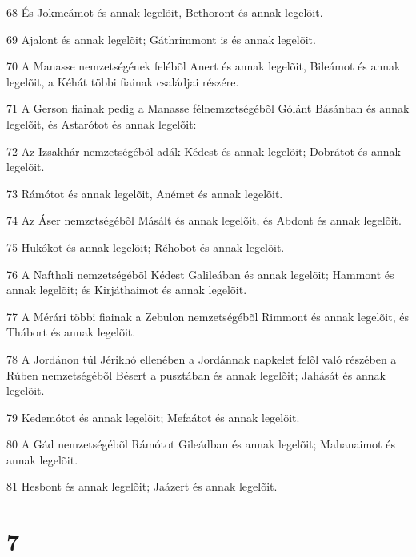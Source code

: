 \par 68 És Jokmeámot és annak legelõit, Bethoront és annak legelõit.
\par 69 Ajalont és annak legelõit; Gáthrimmont is és annak legelõit.
\par 70 A Manasse nemzetségének felébõl Anert és annak legelõit, Bileámot és annak legelõit, a Kéhát többi fiainak családjai részére.
\par 71 A Gerson fiainak pedig a Manasse félnemzetségébõl Gólánt Básánban és annak legelõit, és Astarótot és annak legelõit:
\par 72 Az Izsakhár nemzetségébõl adák Kédest és annak legelõit; Dobrátot és annak legelõit.
\par 73 Rámótot és annak legelõit, Anémet és annak legelõit.
\par 74 Az Áser nemzetségébõl Másált és annak legelõit, és Abdont és annak legelõit.
\par 75 Hukókot és annak legelõit; Réhobot és annak legelõit.
\par 76 A Nafthali nemzetségébõl Kédest Galileában és annak legelõit; Hammont és annak legelõit; és Kirjáthaimot és annak legelõit.
\par 77 A Mérári többi fiainak a Zebulon nemzetségébõl Rimmont és annak legelõit, és Thábort és annak legelõit.
\par 78 A Jordánon túl Jérikhó ellenében a Jordánnak napkelet felõl való részében a Rúben nemzetségébõl Bésert a pusztában és annak legelõit; Jahását és annak legelõit.
\par 79 Kedemótot és annak legelõit; Mefaátot és annak legelõit.
\par 80 A Gád nemzetségébõl Rámótot Gileádban és annak legelõit; Mahanaimot és annak legelõit.
\par 81 Hesbont és annak legelõit; Jaázert és annak legelõit.

\chapter{7}

